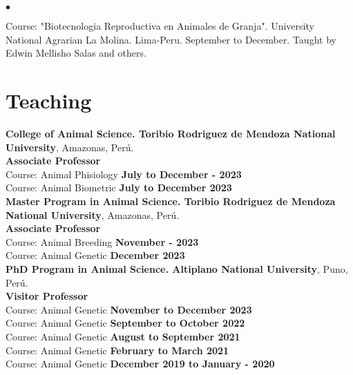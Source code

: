 \documentclass[margin,line,10pt]{res}
\newenvironment{list2}{
  \begin{list}{$\bullet$}{%
      \setlength{\itemsep}{0in}
      \setlength{\parsep}{0in} \setlength{\parskip}{0in}
      \setlength{\topsep}{0in} \setlength{\partopsep}{0in} 
      \setlength{\leftmargin}{0.2in}}}{\end{list}}
\begin{document}
\begin{resume}
\section{}

\begin{list2}
\item Course: "Biotecnologia Reproductiva en Animales de Granja". University National Agrarian La Molina. Lima-Peru. September to December.
Taught by Edwin Mellisho Salas and others.
\end{list2}  
\vspace{0.5cm}


\newpage

\section{\sc Teaching}

{\bf College of Animal Science. Toribio Rodriguez de Mendoza National University}, Amazonas, Perú.\\
\textbf{Associate Professor} \\
Course: Animal Phisiology    \hfill {\bf July to December - 2023}\\
Course: Animal Biometric    \hfill {\bf July to December  2023}\\

{\bf Master Program in Animal Science. Toribio Rodriguez de Mendoza National University}, Amazonas, Perú.\\
\textbf{Associate Professor} \\
Course: Animal Breeding    \hfill {\bf November - 2023}\\
Course: Animal Genetic    \hfill {\bf December  2023}\\


{\bf PhD Program in Animal Science. Altiplano National University}, Puno, Perú.\\
\textbf{Visitor Professor} \\

Course: Animal Genetic   \hfill {\bf November to December 2023}\\
Course: Animal Genetic    \hfill {\bf September to October 2022}\\
Course: Animal Genetic    \hfill {\bf August to September  2021}\\
Course: Animal Genetic    \hfill {\bf February to March  2021}\\
Course: Animal Genetic    \hfill {\bf December 2019 to January - 2020}\\


\end{resume}
\end{document}
